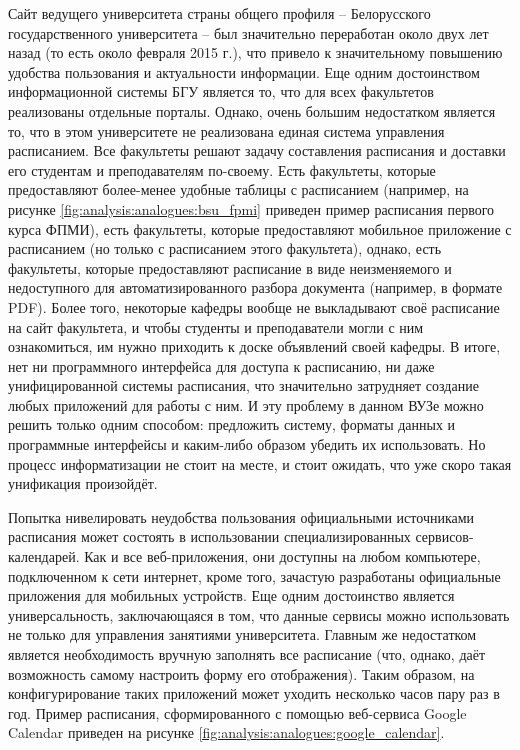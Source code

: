 Сайт ведущего университета страны общего профиля -- Белорусского государственного университета -- был значительно переработан около двух лет назад (то есть около февраля 2015 г.), что привело к значительному повышению удобства пользования и актуальности информации. Еще одним достоинством информационной системы БГУ является то, что для всех факультетов реализованы отдельные порталы. Однако, очень большим недостатком является то, что в этом университете не реализована единая система управления расписанием. Все факультеты решают задачу составления расписания и доставки его студентам и преподавателям по-своему. Есть факультеты, которые предоставляют более-менее удобные таблицы с расписанием (например, на рисунке \ref{fig:analysis:analogues:bsu_fpmi} приведен пример расписания первого курса ФПМИ), есть факультеты, которые предоставляют мобильное приложение с расписанием (но только с расписанием этого факультета), однако, есть факультеты, которые предоставляют расписание в виде неизменяемого и недоступного для автоматизированного разбора документа (например, в формате PDF). Более того, некоторые кафедры вообще не выкладывают своё расписание на сайт факультета, и чтобы студенты и преподаватели могли с ним ознакомиться, им нужно приходить к доске объявлений своей кафедры. В итоге, нет ни программного интерфейса для доступа к расписанию, ни даже унифицированной системы расписания, что значительно затрудняет создание любых приложений для работы с ним. И эту проблему в данном ВУЗе можно решить только одним способом: предложить систему, форматы данных и программные интерфейсы и каким-либо образом убедить их использовать. Но процесс информатизации не стоит на месте, и стоит ожидать, что уже скоро такая унификация произойдёт.

Попытка нивелировать неудобства пользования официальными источниками расписания может состоять в использовании специализированных сер\-висов-календарей. Как и все веб-приложения, они доступны на любом компьютере, подключенном к сети интернет, кроме того, зачастую разработаны официальные приложения для мобильных устройств. Еще одним достоинство является универсальность, заключающаяся в том, что данные сервисы можно использовать не только для управления занятиями университета. Главным же недостатком является необходимость вручную заполнять все расписание (что, однако, даёт возможность самому настроить форму его отображения). Таким образом, на конфигурирование таких приложений может уходить несколько часов пару раз в год. Пример расписания, сформированного с помощью веб-сервиса Google Calendar приведен на рисунке \ref{fig:analysis:analogues:google_calendar}. 

